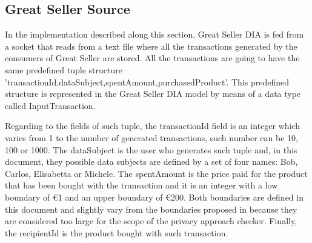 \subsection{Great Seller Source}

In the implementation described along this section, Great Seller DIA is fed from a socket that reads from a text file where all the transactions generated by the consumers of Great Seller are stored. All the transactions are going to have the same predefined tuple structure 'transactionId,dataSubject,spentAmount,purchasedProduct'. This predefined structure is represented in the Great Seller DIA model by means of a data type called InputTransaction.

Regarding to the fields of such tuple, the transactionId field is an integer which varies from 1 to the number of generated transactions, such number can be 10, 100 or 1000. The dataSubject is the user who generates such tuple and, in this document, they possible data subjects are defined by a set of four names: Bob, Carlos, Elisabetta or Michele. The spentAmount is the price paid for the product that has been bought with the transaction and it is an integer with a low boundary of \euro{1} and an upper boundary of \euro{200}. Both boundaries are defined in this document and slightly vary from the boundaries proposed in \cite{privacypoliciesarticle} because they are considered too large for the scope of the privacy approach checker. Finally, the recipientId is the product bought with such transaction.

